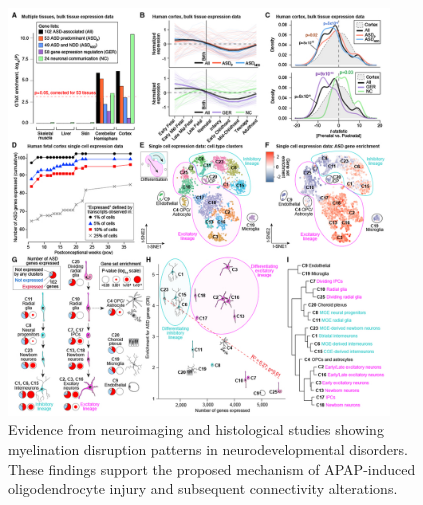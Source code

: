 \documentclass[12pt]{article}
\begin{document}
\begin{figure}[h]
\centering
\includegraphics[width=0.9\textwidth]{../assets/nihms-1569306-f0005.jpg}
\caption{Evidence from neuroimaging and histological studies showing myelination disruption patterns in neurodevelopmental disorders. These findings support the proposed mechanism of APAP-induced oligodendrocyte injury and subsequent connectivity alterations.}
\label{fig:nihms}
\end{figure}


\end{document}
